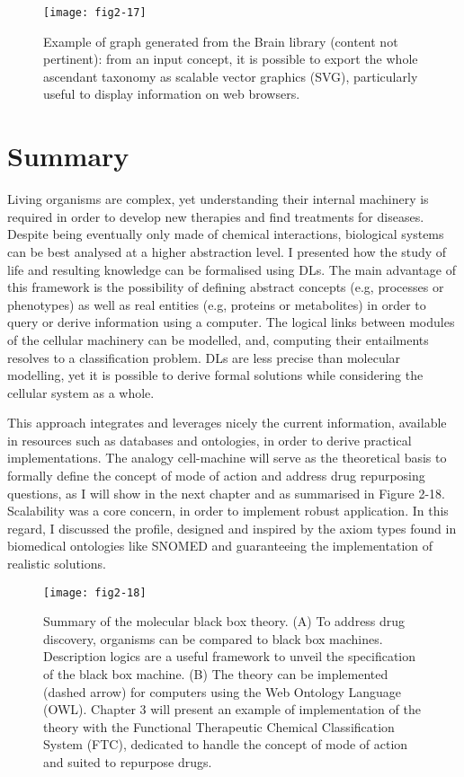 \begin{figure}[ht]
    \centering
    \texttt{[image: fig2-17]}
    \caption{Example of graph generated from the Brain library (content not pertinent): from an input concept, it is possible to export the whole ascendant taxonomy as scalable vector graphics (SVG), particularly useful to display information on web browsers.}
    \label{fig2-17}
\end{figure}

\section{Summary}

Living organisms are complex, yet understanding their internal machinery is required in order to develop new therapies and find treatments for diseases. Despite being eventually only made of chemical interactions, biological systems can be best analysed at a higher abstraction level. I presented how the study of life and resulting knowledge can be formalised using DLs. The main advantage of this framework is the possibility of defining abstract concepts (e.g, processes or phenotypes) as well as real entities (e.g, proteins or metabolites) in order to query or derive information using a computer. The logical links between modules of the cellular machinery can be modelled, and, computing their entailments resolves to a classification problem. DLs are less precise than molecular modelling, yet it is possible to derive formal solutions while considering the cellular system as a whole.

This approach integrates and leverages nicely the current information, available in resources such as databases and ontologies, in order to derive practical implementations. The analogy cell-machine will serve as the theoretical basis to formally define the concept of mode of action and address drug repurposing questions, as I will show in the next chapter and as summarised in Figure 2-18. Scalability was a core concern, in order to implement robust application. In this regard, I discussed the  profile, designed and inspired by the axiom types found in biomedical ontologies like SNOMED and guaranteeing the implementation of realistic solutions.

\begin{figure}[ht]
    \centering
    \texttt{[image: fig2-18]}
    \caption{Summary of the molecular black box theory. (A) To address drug discovery, organisms can be compared to black box machines. Description logics are a useful framework to unveil the specification of the black box machine. (B) The theory can be implemented (dashed arrow) for computers using the Web Ontology Language (OWL). Chapter 3 will present an example of implementation of the theory with the Functional Therapeutic Chemical Classification System (FTC), dedicated to handle the concept of mode of action and suited to repurpose drugs.}
    \label{fig2-18}
\end{figure}
